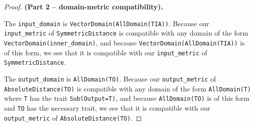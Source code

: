 \documentclass[12pt,letterpaper]{article}
\theoremstyle{definition}
\begin{document}
\begin{proof} \textbf{(Part 2 -- domain-metric compatibility).}

The \texttt{input\_domain} is \texttt{VectorDomain(AllDomain(TIA))}. Because our \texttt{input\_metric} of \texttt{SymmetricDistance} is compatible with any domain of the form \\\texttt{VectorDomain(inner\_domain)}, and because \texttt{VectorDomain(AllDomain(TIA))} is of this form, we see that it is compatible with our \texttt{input\_metric} of \texttt{SymmetricDistance}.

The \texttt{output\_domain} is \texttt{AllDomain(TO)}. Because our \texttt{output\_metric} of \texttt{AbsoluteDistance(TO)} is compatible with any domain of the form \texttt{AllDomain(T)} where \texttt{T} has the trait \texttt{Sub(Output=T)}, and because \texttt{AllDomain(TO)} is of this form and \texttt{TO} has the necessary trait, we see that it is compatible with our \texttt{output\_metric} of \texttt{AbsoluteDistance(TO)}.
\end{proof}
\end{document}
